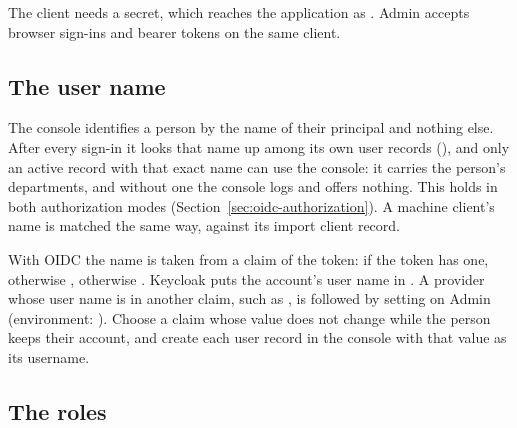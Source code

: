 \documentclass[11pt, a4paper]{article}
\begin{document}
The client needs a secret, which reaches the application as . Admin
accepts browser sign-ins and bearer tokens on the same client.



\subsection{The user name}
\label{sec:oidc-username}

The console identifies a person by the name of their principal and nothing else. After every
sign-in it looks that name up among its own user records (), and
only an active record with that exact name can use the console: it carries the person's
departments, and without one the console logs  and offers nothing. This holds in both authorization modes
(Section~\ref{sec:oidc-authorization}). A machine client's name is matched the same way,
against its import client record.

With OIDC the name is taken from a claim of the token:  if the token has one,
otherwise , otherwise . Keycloak puts the account's user name
in . A provider whose user name is in another claim, such as
, is followed by setting  on Admin
(environment: ). Choose a claim whose value does not
change while the person keeps their account, and create each user record in the console with
that value as its username.

\subsection{The roles}
\end{document}
